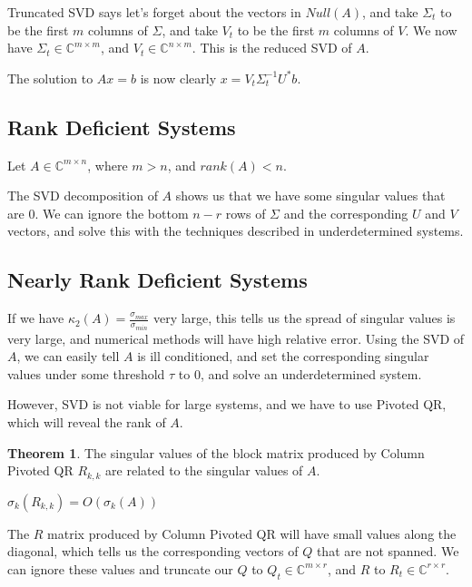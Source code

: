 \documentclass{article}
\theoremstyle{definition}
\newtheorem{theorem}{Theorem}[section]
\begin{document}
Truncated SVD says let's forget about the vectors in $Null(A)$, and take $\Sigma_t$ to be the first $m$ columns of $\Sigma$, and take $V_t$ to be the first $m$ columns of $V$. We now have $\Sigma_t \in \mathbb{C}^{m \times m}$, and $V_t \in \mathbb{C}^{n \times m}$. This is the reduced SVD of $A$.

The solution to $Ax = b$ is now clearly $x = V_t \Sigma_t^{-1} U^* b$.

\subsection{Rank Deficient Systems}

Let $A \in \mathbb{C}^{m \times n}$, where $m > n$, and $rank(A) < n$.

The SVD decomposition of $A$ shows us that we have some singular values that are $0$. We can ignore the bottom $n-r$ rows of $\Sigma$ and the corresponding $U$ and $V$ vectors, and solve this with the techniques described in underdetermined systems.

\subsection{Nearly Rank Deficient Systems}

If we have $\kappa_2(A) = \frac{\sigma_{max}}{\sigma_{min}}$ very large, this tells us the spread of singular values is very large, and numerical methods will have high relative error. Using the SVD of $A$, we can easily tell $A$ is ill conditioned, and set the corresponding singular values under some threshold $\tau$ to $0$, and solve an underdetermined system.

However, SVD is not viable for large systems, and we have to use Pivoted QR, which will reveal the rank of $A$. \newline

\begin{theorem} The singular values of the block matrix produced by Column Pivoted QR $R_{k,k}$ are related to the singular values of $A$.

$\sigma_k(R_{k,k}) = O(\sigma_k(A))$

\end{theorem}

\vspace{3ex}
The $R$ matrix produced by Column Pivoted QR will have small values along the diagonal, which tells us the corresponding vectors of $Q$ that are not spanned. We can ignore these values and truncate our $Q$ to $Q_t \in \mathbb{C}^{m \times r}$, and $R$ to $R_t \in \mathbb{C}^{r \times r}$. 
\end{document}

